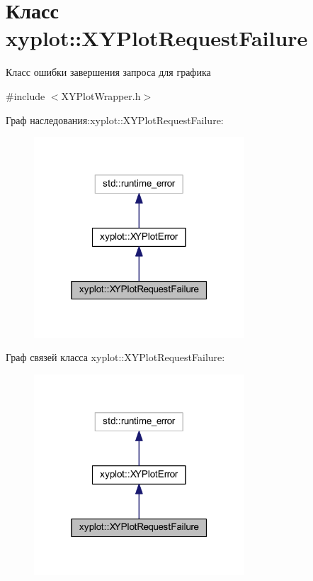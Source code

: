 \hypertarget{classxyplot_1_1_x_y_plot_request_failure}{\section{Класс xyplot\-:\-:X\-Y\-Plot\-Request\-Failure}
\label{classxyplot_1_1_x_y_plot_request_failure}
}


Класс ошибки завершения запроса для графика  




{\ttfamily \#include $<$X\-Y\-Plot\-Wrapper.\-h$>$}



Граф наследования\-:xyplot\-:\-:X\-Y\-Plot\-Request\-Failure\-:\nopagebreak
\begin{figure}[H]
\begin{center}
\leavevmode
\includegraphics[width=223pt]{classxyplot_1_1_x_y_plot_request_failure__inherit__graph}
\end{center}
\end{figure}


Граф связей класса xyplot\-:\-:X\-Y\-Plot\-Request\-Failure\-:\nopagebreak
\begin{figure}[H]
\begin{center}
\leavevmode
\includegraphics[width=223pt]{classxyplot_1_1_x_y_plot_request_failure__coll__graph}
\end{center}
\end{figure}
